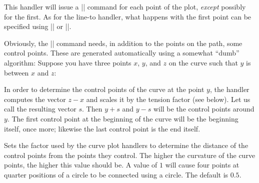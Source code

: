 \begin{command}{\pgfplothandlercurveto}
  This handler will issue a |\pgfpathcurveto| command for each point of
  the plot, \emph{except} possibly for the first. As for the line-to
  handler, what happens with the first point can be specified using
  |\pgfsetmovetofirstplotpoint| or |\pgfsetlinetofirstplotpoint|.

  Obviously, the |\pgfpathcurveto| command needs, in addition to the
  points on the path, some control points. These are generated
  automatically using a somewhat ``dumb'' algorithm: Suppose you have
  three points $x$, $y$, and $z$ on the curve such that $y$ is between
  $x$ and $z$:
\begin{codeexample}[]
\end{codeexample}

  In order to determine the control points of the curve at the point
  $y$, the handler computes the vector $z-x$ and scales it by the
  tension factor (see below). Let us call the resulting vector
  $s$. Then $y+s$ and $y-s$ will be the control points around $y$. The
  first control point at the beginning of the curve will be the
  beginning itself, once more; likewise the last control point is the
  end itself.
\end{command}

\begin{command}{\pgfsetplottension{}}
  Sets the factor used by the curve plot handlers to determine the
  distance of the control points from the points they control. The
  higher the curvature of the curve points, the higher this value
  should be. A value of $1$ will cause four points at quarter
  positions of a circle to be connected using a circle. The default is
  $0.5$. 

\begin{codeexample}[]
\end{codeexample}
\end{command}


